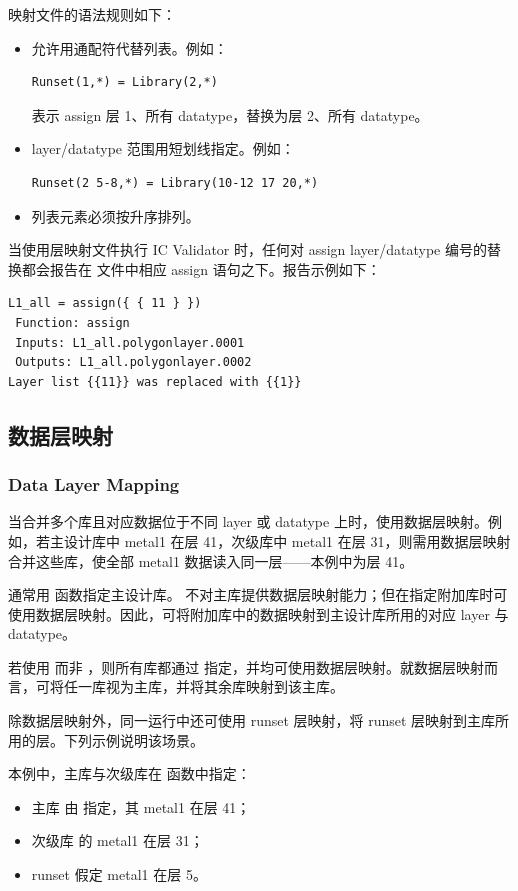 映射文件的语法规则如下：
\begin{itemize}
  \item 允许用通配符代替列表。例如：
\begin{lstlisting}
Runset(1,*) = Library(2,*)
\end{lstlisting}
  表示 assign 层 1、所有 datatype，替换为层 2、所有 datatype。

  \item layer/datatype 范围用短划线指定。例如：
\begin{lstlisting}
Runset(2 5-8,*) = Library(10-12 17 20,*)
\end{lstlisting}

  \item 列表元素必须按升序排列。
\end{itemize}

当使用层映射文件执行 IC Validator 时，任何对 assign layer/datatype 编号的替换都会报告在  文件中相应 assign 语句之下。报告示例如下：
\begin{lstlisting}
L1_all = assign({ { 11 } })
 Function: assign
 Inputs: L1_all.polygonlayer.0001
 Outputs: L1_all.polygonlayer.0002
Layer list {{11}} was replaced with {{1}}
\end{lstlisting}

\subsection{数据层映射}
\subsubsection*{Data Layer Mapping}

当合并多个库且对应数据位于不同 layer 或 datatype 上时，使用数据层映射。例如，若主设计库中 metal1 在层 41，次级库中 metal1 在层 31，则需用数据层映射合并这些库，使全部 metal1 数据读入同一层——本例中为层 41。

通常用  函数指定主设计库。 不对主库提供数据层映射能力；但在指定附加库时可使用数据层映射。因此，可将附加库中的数据映射到主设计库所用的对应 layer 与 datatype。

若使用  而非 ，则所有库都通过  指定，并均可使用数据层映射。就数据层映射而言，可将任一库视为主库，并将其余库映射到该主库。

除数据层映射外，同一运行中还可使用 runset 层映射，将 runset 层映射到主库所用的层。下列示例说明该场景。

本例中，主库与次级库在  函数中指定：
\begin{itemize}
  \item 主库  由  指定，其 metal1 在层 41；
  \item 次级库  的 metal1 在层 31；
  \item runset 假定 metal1 在层 5。
\end{itemize}

